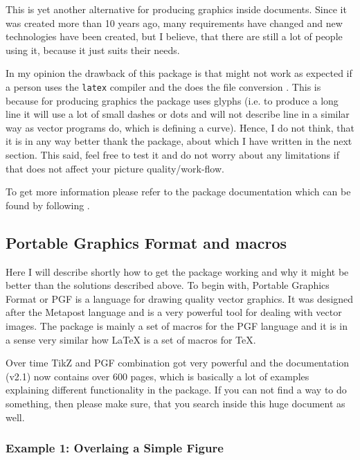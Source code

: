 \documentclass[
]{scrartcl}
\begin{document}
%
This is yet another alternative for producing graphics inside 
    documents.
%
Since it was created more than 10 years ago, many requirements have changed and
    new technologies have been created, but I believe, that there are still a
    lot of people using it, because it just suits their needs.

%
In my opinion the drawback of this package is that might not work as expected if
    a person uses the \texttt{latex} compiler and the does the file conversion
     \textrightarrow {} \textrightarrow {}.
%
This is because for producing graphics the package uses glyphs (i.e. to produce
    a long line it will use a lot of small dashes or dots and will not describe
    line in a similar way as vector programs do, which is defining a curve).
%
Hence, I do not think, that it is in any way better thank the 
    package, about which I have written in the next section.
%
This said, feel free to test it and do not worry about any limitations if that
    does not affect your picture quality/work-flow.

%
To get more information please refer to the package documentation which can be
    found by following .

%
\subsection{Portable Graphics Format and  macros}

%
Here I will describe shortly how to get the  package working and why
    it might be better than the solutions described above.
%
To begin with, Portable Graphics Format or PGF is a language for drawing quality
    vector graphics.
%
It was designed after the Metapost language and is a very powerful tool for
    dealing with vector images.
%
The  package is mainly a set of macros for the PGF language and it is
    in a sense very similar how \LaTeX{} is a set of macros for \TeX{}.

%
Over time TikZ and PGF combination got very powerful and the documentation
    (v2.1) now contains over 600 pages, which is basically a lot of examples
    explaining different functionality in the package.
%
If you can not find a way to do something, then please make sure, that you
    search inside this huge document as well.

%
\subsubsection{Example 1: Overlaing a Simple Figure}
\end{document}
